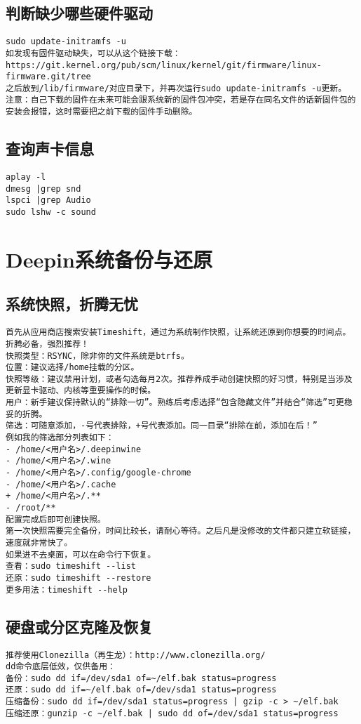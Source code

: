 \documentclass[a4paper,fontset=fandol,zihao=-4,linespread=1.2]{ctexbook}
\begin{document}
\section{判断缺少哪些硬件驱动}
\begin{lstlisting}
sudo update-initramfs -u
如发现有固件驱动缺失，可以从这个链接下载：
https://git.kernel.org/pub/scm/linux/kernel/git/firmware/linux-firmware.git/tree
之后放到/lib/firmware/对应目录下，并再次运行sudo update-initramfs -u更新。
注意：自己下载的固件在未来可能会跟系统新的固件包冲突，若是存在同名文件的话新固件包的安装会报错，这时需要把之前下载的固件手动删除。
\end{lstlisting}

\section{查询声卡信息}
\begin{lstlisting}
aplay -l
dmesg |grep snd
lspci |grep Audio
sudo lshw -c sound
\end{lstlisting}


\chapter{Deepin系统备份与还原}

\section{系统快照，折腾无忧}
\begin{lstlisting}
首先从应用商店搜索安装Timeshift，通过为系统制作快照，让系统还原到你想要的时间点。折腾必备，强烈推荐！
快照类型：RSYNC，除非你的文件系统是btrfs。
位置：建议选择/home挂载的分区。
快照等级：建议禁用计划，或者勾选每月2次。推荐养成手动创建快照的好习惯，特别是当涉及更新显卡驱动、内核等重要操作的时候。
用户：新手建议保持默认的“排除一切”。熟练后考虑选择“包含隐藏文件”并结合“筛选”可更稳妥的折腾。
筛选：可随意添加，-号代表排除，+号代表添加。同一目录“排除在前，添加在后！”
例如我的筛选部分列表如下：
- /home/<用户名>/.deepinwine
- /home/<用户名>/.wine
- /home/<用户名>/.config/google-chrome
- /home/<用户名>/.cache
+ /home/<用户名>/.**
- /root/**
配置完成后即可创建快照。
第一次快照需要完全备份，时间比较长，请耐心等待。之后凡是没修改的文件都只建立软链接，速度就非常快了。
如果进不去桌面，可以在命令行下恢复。
查看：sudo timeshift --list
还原：sudo timeshift --restore
更多用法：timeshift --help
\end{lstlisting}

\section{硬盘或分区克隆及恢复}
\begin{lstlisting}
推荐使用Clonezilla（再生龙）：http://www.clonezilla.org/
dd命令底层低效，仅供备用：
备份：sudo dd if=/dev/sda1 of=~/elf.bak status=progress
还原：sudo dd if=~/elf.bak of=/dev/sda1 status=progress
压缩备份：sudo dd if=/dev/sda1 status=progress | gzip -c > ~/elf.bak
压缩还原：gunzip -c ~/elf.bak | sudo dd of=/dev/sda1 status=progress
\end{lstlisting}
\end{document}
